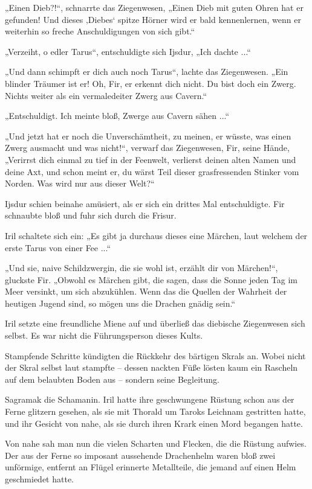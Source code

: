 „Einen Dieb?!“, schnarrte das Ziegenwesen, „Einen Dieb mit guten Ohren hat er gefunden! Und dieses ‚Diebes‘ spitze Hörner wird er bald kennenlernen, wenn er weiterhin so freche Anschuldigungen von sich gibt.“

„Verzeiht, o edler Tarus“, entschuldigte sich Ijsdur, „Ich dachte ...“

„Und dann schimpft er dich auch noch Tarus“, lachte das Ziegenwesen. „Ein blinder Träumer ist er! Oh, Fir, er erkennt dich nicht. Du bist doch ein Zwerg. Nichts weiter als ein vermaledeiter Zwerg aus Cavern.“

„Entschuldigt. Ich meinte bloß, Zwerge aus Cavern sähen ...“

„Und jetzt hat er noch die Unverschämtheit, zu meinen, er wüsste, was einen Zwerg ausmacht und was nicht!“, verwarf das Ziegenwesen, Fir, seine Hände, „Verirrst dich einmal zu tief in der Feenwelt, verlierst deinen alten Namen und deine Axt, und schon meint er, du wärst Teil dieser grasfressenden Stinker vom Norden. Was wird nur aus dieser Welt?“

Ijsdur schien beinahe amüsiert, als er sich ein drittes Mal entschuldigte. Fir schnaubte bloß und fuhr sich durch die Frisur.

Iril schaltete sich ein: „Es gibt ja durchaus dieses eine Märchen, laut welchem der erste Tarus von einer Fee ...“

„Und sie, naive Schildzwergin, die sie wohl ist, erzählt dir von Märchen!“, gluckste Fir. „Obwohl es Märchen gibt, die sagen, dass die Sonne jeden Tag im Meer versinkt, um sich abzukühlen. Wenn das die Quellen der Wahrheit der heutigen Jugend sind, so mögen uns die Drachen gnädig sein.“

Iril setzte eine freundliche Miene auf und überließ das diebische Ziegenwesen sich selbst. Es war nicht die Führungsperson dieses Kults.

Stampfende Schritte kündigten die Rückkehr des bärtigen Skrals an. Wobei nicht der Skral selbst laut stampfte – dessen nackten Füße lösten kaum ein Rascheln auf dem belaubten Boden aus – sondern seine Begleitung.

Sagramak die Schamanin. Iril hatte ihre geschwungene Rüstung schon aus der Ferne glitzern gesehen, als sie mit Thorald um Taroks Leichnam gestritten hatte, und ihr Gesicht von nahe, als sie durch ihren Krark einen Mord begangen hatte.

Von nahe sah man nun die vielen Scharten und Flecken, die die Rüstung aufwies. Der aus der Ferne so imposant aussehende Drachenhelm waren bloß zwei unförmige, entfernt an Flügel erinnerte Metallteile, die jemand auf einen Helm geschmiedet hatte.

